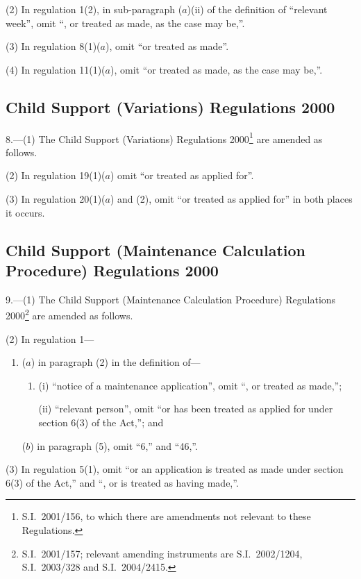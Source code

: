 \documentclass[12pt,a4paper]{article}
\begin{document}
(2) In regulation 1(2), in sub-paragraph ($a$)(ii)  of the definition of “relevant week”, omit “, or treated as made, as the case may be,”.

(3) In regulation 8(1)($a$), omit “or treated as made”.

(4) In regulation 11(1)($a$), omit “or treated as made, as the case may be,”.

\subsection[8. Child Support (Variations) Regulations 2000]{Child Support (Variations) Regulations 2000}

8.---(1)  The Child Support (Variations) Regulations 2000\footnote{S.I.~2001/156, to which there are amendments not relevant to these Regulations.} are amended as follows.

(2) In regulation 19(1)($a$)  omit “or treated as applied for”.

(3) In regulation 20(1)($a$)  and (2), omit “or treated as applied for” in both places it occurs.

\subsection[9. Child Support (Maintenance Calculation Procedure) Regulations 2000]{\sloppy Child Support (Maintenance Calculation Procedure) Regulations 2000}

9.---(1)  The Child Support (Maintenance Calculation Procedure) Regulations 2000\footnote{S.I.~2001/157; relevant amending instruments are S.I.~2002/1204, S.I.~2003/328 and S.I.~2004/2415.} are amended as follows.

(2) In regulation 1—
\begin{enumerate}\item[]
($a$) in paragraph (2) in the definition of—
\begin{enumerate}\item[]
(i) “notice of a maintenance application”, omit “, or treated as made,”;

(ii) “relevant person”, omit “or has been treated as applied for under section 6(3) of the Act,”; and
\end{enumerate}

($b$) in paragraph (5), omit “6,” and “46,”.
\end{enumerate}

(3) In regulation 5(1), omit “or an application is treated as made under section 6(3) of the Act,” and “, or is treated as having made,”.
\end{document}
